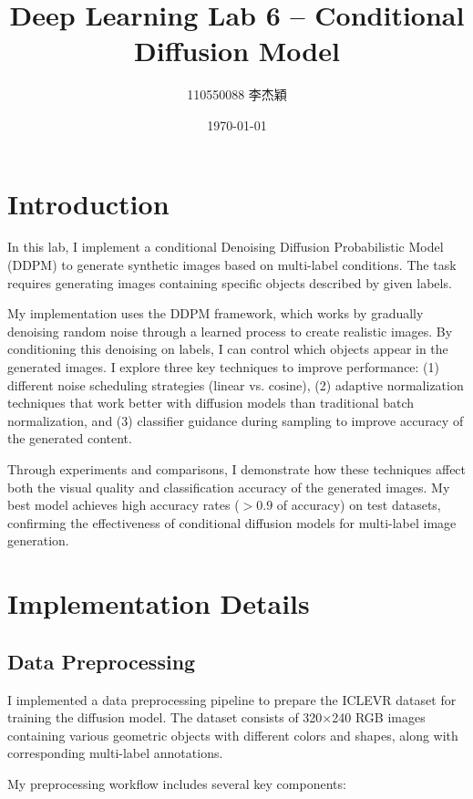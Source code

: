 \documentclass[a4paper,twocolumn]{article}
\title{Deep Learning Lab 6 -- Conditional Diffusion Model}
\author{110550088 李杰穎}
\date{\today}
\begin{document}
\maketitle
\section{Introduction}

In this lab, I implement a conditional Denoising Diffusion Probabilistic Model (DDPM) to generate synthetic images based on multi-label conditions. The task requires generating images containing specific objects described by given labels.

My implementation uses the DDPM framework, which works by gradually denoising random noise through a learned process to create realistic images. By conditioning this denoising on labels, I can control which objects appear in the generated images. I explore three key techniques to improve performance: (1) different noise scheduling strategies (linear vs. cosine), (2) adaptive normalization techniques that work better with diffusion models than traditional batch normalization, and (3) classifier guidance during sampling to improve accuracy of the generated content.

Through experiments and comparisons, I demonstrate how these techniques affect both the visual quality and classification accuracy of the generated images. My best model achieves high accuracy rates ($>0.9$ of accuracy) on test datasets, confirming the effectiveness of conditional diffusion models for multi-label image generation.

\section{Implementation Details}


\subsection{Data Preprocessing}

I implemented a data preprocessing pipeline to prepare the ICLEVR dataset for training the diffusion model. The dataset consists of 320×240 RGB images containing various geometric objects with different colors and shapes, along with corresponding multi-label annotations.

My preprocessing workflow includes several key components:
\end{document}

